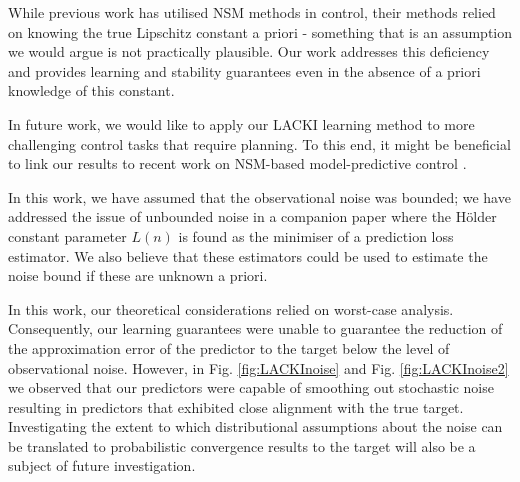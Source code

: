 While previous work has utilised NSM methods in control, their methods relied on knowing the true Lipschitz constant a priori - something that is an assumption we would argue is not practically plausible.
Our work addresses this deficiency and provides learning and stability guarantees even in the absence of a priori knowledge of this constant.


In future work, we would like to apply our LACKI learning method to more challenging control tasks that require planning.
To this end, it might be beneficial to link our results to recent work on NSM-based model-predictive control \cite{Canale2014}.

In this work, we have assumed that the observational noise was bounded; we have addressed the issue of unbounded noise in a companion paper \cite{POKIdraft2016} where the H\"older constant parameter $L(n)$ is found as the minimiser of a prediction loss estimator.  We also believe that these estimators could be used to estimate the noise bound if these are unknown a priori.

In this work, our theoretical considerations relied on worst-case analysis. Consequently, our learning guarantees were unable to guarantee the reduction of the approximation error of the predictor to the target below the level of observational noise. However, in Fig. \ref{fig:LACKInoise} and Fig. \ref{fig:LACKInoise2} we observed that our predictors were capable of smoothing out stochastic noise resulting in predictors that exhibited close alignment with the true target. Investigating the extent to which distributional assumptions about the noise can be translated to probabilistic convergence results to the target will also be a subject of future investigation. 




